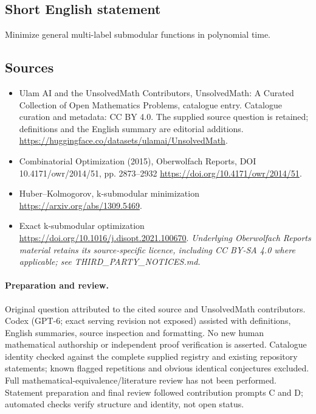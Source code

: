 \documentclass[11pt]{article}
\begin{document}
\subsection{Short English statement}
Minimize general multi-label submodular functions in polynomial time.
\subsection{Sources}
\begin{itemize}
\item[\hypertarget{source:statement:1}{S1}] Ulam AI and the UnsolvedMath Contributors, UnsolvedMath: A Curated Collection of Open Mathematics Problems, catalogue entry. Catalogue curation and metadata: CC BY 4.0. The supplied source question is retained; definitions and the English summary are editorial additions.
\url{https://huggingface.co/datasets/ulamai/UnsolvedMath}.
\item[\hypertarget{source:statement:2}{S2}] Combinatorial Optimization (2015), Oberwolfach Reports, DOI 10.4171/owr/2014/51, pp. 2873--2932
\url{https://doi.org/10.4171/owr/2014/51}.
\item[\hypertarget{source:statement:3}{S3}] Huber--Kolmogorov, k-submodular minimization
\url{https://arxiv.org/abs/1309.5469}.
\item[\hypertarget{source:statement:4}{S4}] Exact k-submodular optimization
\url{https://doi.org/10.1016/j.disopt.2021.100670}.
\textit{Underlying Oberwolfach Reports material retains its source-specific licence, including CC BY-SA 4.0 where applicable; see THIRD\_PARTY\_NOTICES.md.}
\end{itemize}
\paragraph{Preparation and review.}
Original question attributed to the cited source and UnsolvedMath contributors. Codex (GPT-6; exact serving revision not exposed) assisted with definitions, English summaries, source inspection and formatting. No new human mathematical authorship or independent proof verification is asserted. Catalogue identity checked against the complete supplied registry and existing repository statements; known flagged repetitions and obvious identical conjectures excluded. Full mathematical-equivalence/literature review has not been performed. Statement preparation and final review followed contribution prompts C and D; automated checks verify structure and identity, not open status.
\label{end:statement}
\end{document}
